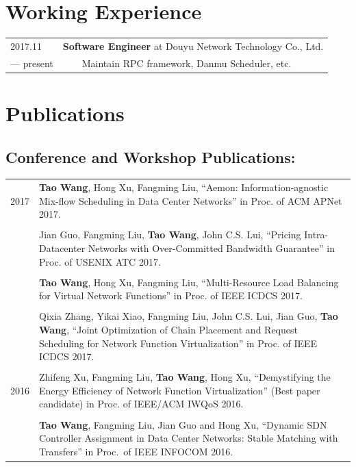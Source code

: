 \documentclass[10pt,fullpage]{article}
\begin{document}

\section*{Working Experience}

\begin{tabular}{ll}
	2017.11 & {\bf Software Engineer} at Douyu Network Technology Co., Ltd.  \\
	--- present & ~~~~Maintain RPC framework, Danmu Scheduler, etc. \\
\end{tabular}

\section*{Publications}

\subsection*{Conference and Workshop Publications:}
\begin{longtable}{p{0.5in}|p{5.5in}}
	2017 & \textbf{Tao Wang}, Hong Xu, Fangming Liu, ``Aemon: Information-agnostic Mix-flow Scheduling in Data Center Networks'' in Proc. of ACM APNet 2017. \\
	& \\
	& Jian Guo, Fangming Liu, \textbf{Tao Wang}, John C.S. Lui, ``Pricing Intra-Datacenter Networks with Over-Committed Bandwidth Guarantee'' in Proc. of USENIX ATC 2017. \\
	& \\
	& \textbf{Tao Wang}, Hong Xu, Fangming Liu, ``Multi-Resource Load Balancing for Virtual Network Functions'' in Proc. of IEEE ICDCS 2017. \\
	& \\
	& Qixia Zhang, Yikai Xiao, Fangming Liu, John C.S. Lui, Jian Guo, \textbf{Tao Wang}, ``Joint Optimization of Chain Placement and Request Scheduling for Network Function Virtualization'' in Proc. of IEEE ICDCS 2017. \\
	& \\
	2016 & Zhifeng Xu, Fangming Liu, \textbf{Tao Wang}, Hong Xu, ``Demystifying the Energy Efficiency of Network Function Virtualization'' (Best paper candidate) in Proc. of IEEE/ACM IWQoS 2016. \\
	& \\
	& \textbf{Tao Wang}, Fangming Liu, Jian Guo and Hong Xu, ``Dynamic SDN Controller Assignment in Data Center Networks: Stable Matching with Transfers'' in Proc.~of IEEE INFOCOM 2016. \\
\end{longtable}
\end{document}
